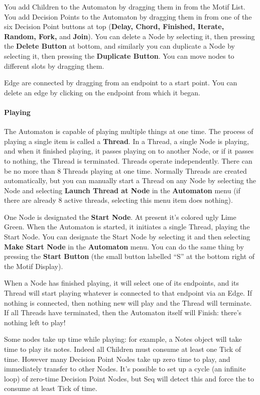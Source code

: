 \documentclass[twoside,10pt]{article}
\begin{document}
You add Children to the Automaton by dragging them in from the Motif List.  You add Decision Points to the Automaton by dragging them in from one of the six Decision Point buttons at top ({\bf Delay, Chord, Finished, Iterate, Random, Fork,} and {\bf Join}).  You can delete a Node by selecting it, then pressing the {\bf Delete Button} at bottom, and similarly you can duplicate a Node by selecting it, then pressing the {\bf Duplicate Button}.  You can move nodes to different slots by dragging them. 

Edge are connected by dragging from an endpoint to a start point.  You can delete an edge by clicking on the endpoint from which it began.

\paragraph{Playing}

The Automaton is capable of playing multiple things at one time.  The process of playing a single item is called a {\bf Thread}.   In a Thread, a single Node is playing, and when it finished playing, it passes playing on to another Node, or if it passes to nothing, the Thread is terminated.  Threads operate independently.  There can be no more than 8 Threads playing at one time.  Normally Threads are created automatically, but you can manually start a Thread on any Node by selecting the Node and selecting {\bf Launch Thread at Node} in the {\bf Automaton} menu (if there are already 8 active threads, selecting this menu item does nothing).

One Node is designated the {\bf Start Node}.  At present it's colored ugly Lime Green.  When the Automaton is started, it initiates a single Thread, playing the Start Node.  You can designate the Start Node by selecting it and then selecting {\bf Make Start Node} in the {\bf Automaton} menu.  You can do the same thing by pressing the {\bf Start Button} (the small button labelled ``S'' at the bottom right of the Motif Display).

When a Node has finished playing, it will select one of its endpoints, and its Thread will start playing whatever is connected to that endpoint via an Edge.  If nothing is connected, then nothing new will play and the Thread will terminate.  If all Threads have terminated, then the Automaton itself will Finish: there's nothing left to play!

Some nodes take up time while playing: for example, a Notes object will take time to play its notes.  Indeed all Children must consume at least one Tick of time.  However many Decision Point Nodes take up zero time to play, and immediately transfer to other Nodes.  It's possible to set up a cycle (an infinite loop) of zero-time Decision Point Nodes, but Seq will detect this and force the to consume at least Tick of time.
\end{document}
